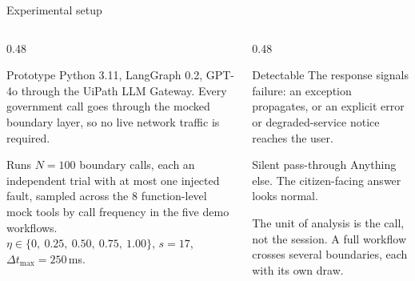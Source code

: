 \documentclass[aspectratio=169,10pt]{beamer}
\newcommand{\cmt}[1]{{\color{stone}\small #1}}          %
\begin{document}
\begin{frame}{Experimental setup}
  \begin{columns}[T]
    \begin{column}{0.48\textwidth}
      \begin{block}{Prototype}
        \small Python 3.11, LangGraph 0.2, GPT-4o through the UiPath LLM Gateway.
        Every government call goes through the mocked boundary layer, so no live network
        traffic is required.
      \end{block}
      \begin{block}{Runs}
        \small $N = 100$ boundary calls, each an independent trial with at most one injected
        fault, sampled across the 8 function-level mock tools by call frequency in the five
        demo workflows.\\[0.3em]
        $\eta \in \{0,\ 0.25,\ 0.50,\ 0.75,\ 1.00\}$, \quad $s = 17$, \quad
        $\Delta t_{\max} = 250$\,ms.
      \end{block}
    \end{column}
    \begin{column}{0.48\textwidth}
      \begin{block}{Detectable}
        \small The response signals failure: an exception propagates, or an explicit error or
        degraded-service notice reaches the user.
      \end{block}
      \begin{alertblock}{Silent pass-through}
        \small Anything else. The citizen-facing answer looks normal.
      \end{alertblock}
      \medskip
      \cmt{The unit of analysis is the call, not the session. A full workflow crosses several
      boundaries, each with its own draw.}
    \end{column}
  \end{columns}
\end{frame}
\end{document}
